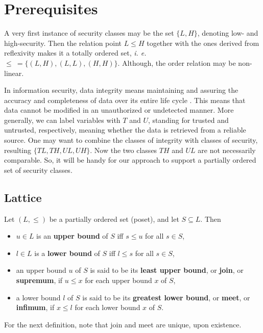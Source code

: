 \documentclass{llncs}
\begin{document}
\section{Prerequisites}

A very first instance of security classes may be the set $\{L, H\}$, denoting low- and high-security. Then the relation point $L \leq H$ together with the ones derived from reflexivity makes it a totally ordered set, \textit{i. e.} $\leq\ = \{(L, H), (L, L), (H, H)\}$. Although, the order relation may be non-linear. 

In information security, data integrity means maintaining and assuring the accuracy and completeness of data over its entire life cycle \cite{Boritz2005}. This means that data cannot be modified in an unauthorized or undetected manner. More generally, we can label variables with $T$ and $U$, standing for trusted and untrusted, respectively, meaning whether the data is retrieved from a reliable source.
One may want to combine the classes of integrity with classes of security, resulting $\{TL, TH, UL, UH\}$. Now the two classes $TH$ and $UL$ are not necessarily comparable. So, it will be handy for our approach to support a partially ordered set of security classes.

\subsection{Lattice}

\begin{definition}
Let $(L, \leq)$ be a partially ordered set (poset), and let $S \subseteq L$. Then
\begin{itemize}
    \item $u \in L$ is an \textbf{upper bound} of $S$ iff $s \leq u$ for all $s \in S$,
    \item $l \in L$ is a \textbf{lower bound} of $S$ iff $l \leq s$ for all $s \in S$,\
    \item an upper bound $u$ of $S$ is said to be its \textbf{least upper bound}, or \textbf{join}, or \textbf{supremum}, if $u \leq x$ for each upper bound $x$ of $S$,
    \item a lower bound $l$ of $S$ is said to be its \textbf{greatest lower bound}, or \textbf{meet}, or \textbf{infimum}, if $x \leq l$ for each lower bound $x$ of $S$.
\end{itemize}
\end{definition}

For the next definition, note that join and meet are unique, upon existence.
\end{document}
